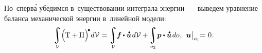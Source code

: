 \begin{otherlanguage}{russian}
Но~сперв\'{а} убедимся в~существовании интеграла энергии~--- выведем уравнение баланса механической энергии в~линейной модели:
\begin{equation}\label{dynamicsoflineartheory:integralofenergy}
\integral\displaylimits_{\mathcal{V}} \hspace{-0.42ex} \left(^{\mathstrut} \hspace{-0.2ex} \mathrm{T} + \Pi \right)^{\hspace{-0.12em}\tikz[baseline=-0.2ex] \draw[black, fill=black] (0,0) circle (.28ex);} \hspace{-0.25ex} d\mathcal{V} \hspace{.1ex} =
\integral\displaylimits_{\mathcal{V}} \hspace{-0.5ex} \bm{f} \hspace{-0.1ex} \dotp \mathdotabove{\bm{u}} \hspace{0.25ex} d\mathcal{V} + \hspace{-0.12ex}
\integral\displaylimits_{o_2} \hspace{-0.32ex} \bm{p} \dotp \mathdotabove{\bm{u}} \hspace{0.25ex} do \hspace{.1ex}, \:\:
\bm{u} \hspace{0.1ex} \bigr|_{o_1} \hspace{-0.64ex} = \hspace{0.2ex} 0 \hspace{.1ex}.
\end{equation}


\end{otherlanguage}
